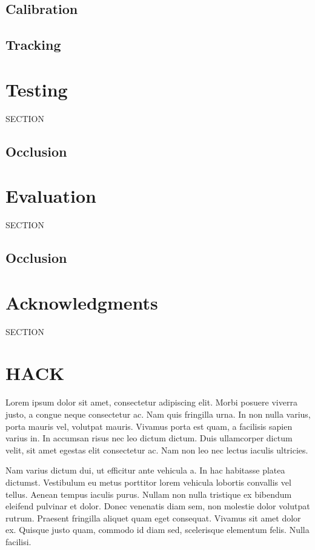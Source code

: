 \documentclass{sigchi}
\begin{document}
\subsection{Calibration}

\subsection{Tracking}

\section{Testing}

SECTION

\subsection{Occlusion}

\section{Evaluation}

SECTION

\subsection{Occlusion}

\section{Acknowledgments}

SECTION

\section{HACK}

Lorem ipsum dolor sit amet, consectetur adipiscing elit. Morbi posuere viverra justo, a congue neque consectetur ac. Nam quis fringilla urna. In non nulla varius, porta mauris vel, volutpat mauris. Vivamus porta est quam, a facilisis sapien varius in. In accumsan risus nec leo dictum dictum. Duis ullamcorper dictum velit, sit amet egestas elit consectetur ac. Nam non leo nec lectus iaculis ultricies.

Nam varius dictum dui, ut efficitur ante vehicula a. In hac habitasse platea dictumst. Vestibulum eu metus porttitor lorem vehicula lobortis convallis vel tellus. Aenean tempus iaculis purus. Nullam non nulla tristique ex bibendum eleifend pulvinar et dolor. Donec venenatis diam sem, non molestie dolor volutpat rutrum. Praesent fringilla aliquet quam eget consequat. Vivamus sit amet dolor ex. Quisque justo quam, commodo id diam sed, scelerisque elementum felis. Nulla facilisi.
\end{document}

